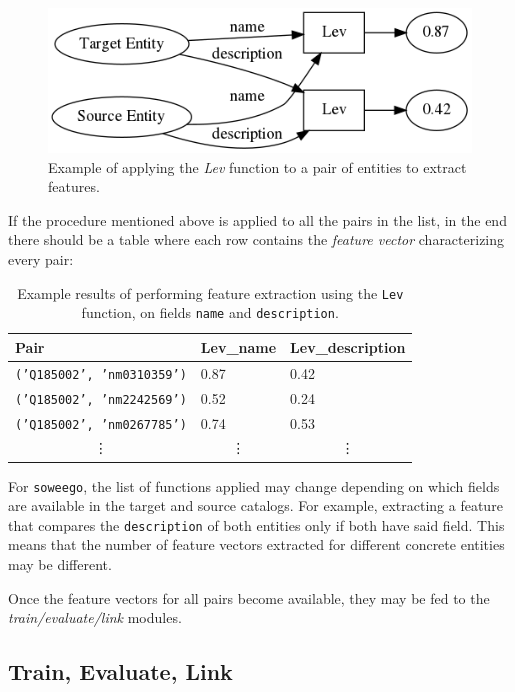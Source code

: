 \documentclass[epsfig,a4paper,11pt,titlepage,twoside,openany]{book}
\begin{document}
\begin{figure}[H]
  \centering \includegraphics[width=.6\textwidth]{feature_extraction}
  \caption{Example of applying the \textit{Lev} function to a pair of entities to extract features.}
  \label{fig:feature-extractions-flow-ex}
\end{figure}

If the procedure mentioned above is applied to all the pairs in the list, in the end there should be a table where each row contains the \textit{feature vector} characterizing every pair:

\begin{table}[H]
\centering
\begin{tabular}{l|l|l}
Pair                     & Lev\_name             & Lev\_description      \\ \hline
\texttt{('Q185002', 'nm0310359')} & 0.87                  & 0.42                  \\
\texttt{('Q185002', 'nm2242569')} & 0.52                  & 0.24                  \\
\texttt{('Q185002', 'nm0267785')} & 0.74                  & 0.53                  \\
\multicolumn{1}{c}{\vdots}    & \multicolumn{1}{c}{\vdots}  & \multicolumn{1}{c}{\vdots}  
\end{tabular}
\caption{Example results of performing feature extraction using the \texttt{Lev} function, on fields \texttt{name} and \texttt{description}.}
\label{tab:soweego-feature-extraction-example-results}
\end{table}


For \texttt{soweego}, the list of functions applied may change depending on which fields are available in the target and source catalogs. For example, extracting a feature that compares the \texttt{description} of both entities only if both have said field. This means that the number of feature vectors extracted for different concrete entities may be different. 

Once the feature vectors for all pairs become available, they may be fed to the \textit{train/evaluate/link} modules. 


\subsection{Train, Evaluate, Link}
\label{sec:soweego-st-train-evaluate-link}
\end{document}
